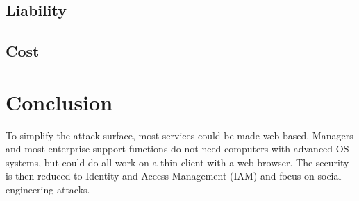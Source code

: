\documentclass[
	letterpaper, %
	10pt, %
	unnumberedsections, %
	twoside, %
]{APAAssignment}
\begin{document}
\subsection{Liability}

\subsection{Cost}


\section{Conclusion}
To simplify the attack surface, most services could be made web based. Managers and most enterprise support functions do not need computers with advanced OS systems, but could do all work on a thin client with a web browser. The security is then reduced to Identity and Access Management (IAM) and focus on social engineering attacks.
\clearpage
\printbibliography %





\appendix


\clearpage
\end{document}
